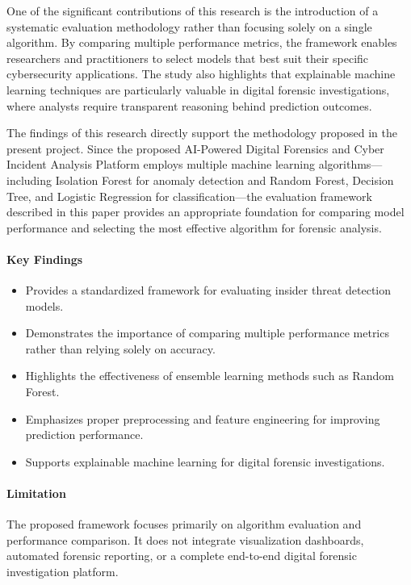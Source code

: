One of the significant contributions of this research is the introduction of a systematic evaluation methodology rather than focusing solely on a single algorithm. By comparing multiple performance metrics, the framework enables researchers and practitioners to select models that best suit their specific cybersecurity applications. The study also highlights that explainable machine learning techniques are particularly valuable in digital forensic investigations, where analysts require transparent reasoning behind prediction outcomes.

The findings of this research directly support the methodology proposed in the present project. Since the proposed AI-Powered Digital Forensics and Cyber Incident Analysis Platform employs multiple machine learning algorithms---including Isolation Forest for anomaly detection and Random Forest, Decision Tree, and Logistic Regression for classification---the evaluation framework described in this paper provides an appropriate foundation for comparing model performance and selecting the most effective algorithm for forensic analysis.

\paragraph{Key Findings}
\begin{itemize}
  \item Provides a standardized framework for evaluating insider threat detection models.
  \item Demonstrates the importance of comparing multiple performance metrics rather than relying solely on accuracy.
  \item Highlights the effectiveness of ensemble learning methods such as Random Forest.
  \item Emphasizes proper preprocessing and feature engineering for improving prediction performance.
  \item Supports explainable machine learning for digital forensic investigations.
\end{itemize}
\paragraph{Limitation}
The proposed framework focuses primarily on algorithm evaluation and performance comparison. It does not integrate visualization dashboards, automated forensic reporting, or a complete end-to-end digital forensic investigation platform.


